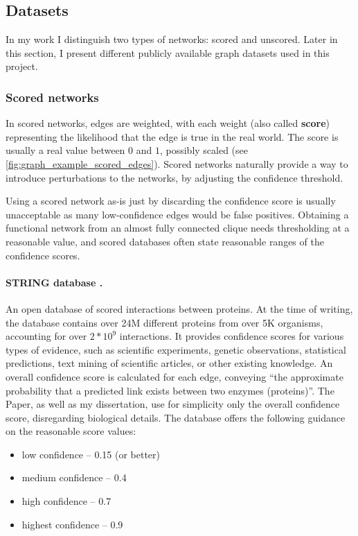\subsection{Datasets}\label{sec:datasets}

In my work I distinguish two types of networks: scored and unscored.
Later in this section, I present different publicly available graph datasets used in this project.

\subsubsection*{Scored networks}\label{sec:scored_networks}

In scored networks, edges are weighted, with each weight (also called \textbf{score}) representing the likelihood that the edge is true in the real world.
The score is usually a real value between $0$ and $1$, possibly scaled (see \cref{fig:graph_example_scored_edges}).
Scored networks naturally provide a way to introduce perturbations to the networks, by adjusting the confidence threshold.

Using a scored network as-is just by discarding the confidence score is usually unacceptable as many low-confidence edges would be false positives.
Obtaining a functional network from an almost fully connected clique needs thresholding at a reasonable value, and scored databases often state reasonable ranges of the confidence scores.



\paragraph*{STRING database {\normalfont\cite{Szklarczyk2019}}.} An open database of scored interactions between proteins.
At the time of writing, the database contains over 24M different proteins from over 5K organisms, accounting for over $2 * 10^9$ interactions.
It provides confidence scores for various types of evidence, such as scientific experiments, genetic observations, statistical predictions, text mining of scientific articles, or other existing knowledge.
An overall confidence score is calculated for each edge, conveying \enquote{the approximate probability that a predicted link exists between two enzymes (proteins)}.
The Paper, as well as my dissertation, use for simplicity only the overall confidence score, disregarding biological details.
The database offers the following guidance on the reasonable score values:
\begin{itemize}[topsep=5pt,itemsep=-2pt]
    \item low confidence -- 0.15 (or better)
    \item medium confidence -- 0.4
    \item high confidence -- 0.7
    \item highest confidence -- 0.9
\end{itemize}

